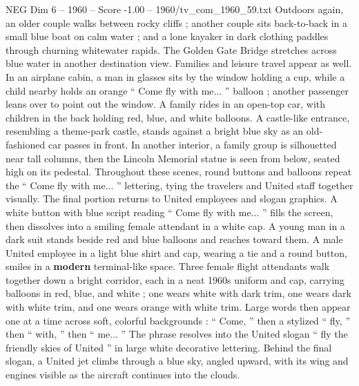 \begin{textsample}{NEG Dim 6 – 1960 – Score -1.00 – 1960/tv\_com\_1960\_59.txt}
Outdoors again, an older couple walks between rocky cliffs ; another couple sits back-to-back in a small blue boat on calm water ; and a lone kayaker in dark clothing paddles through churning whitewater rapids.
The Golden Gate Bridge stretches across blue water in another destination view.
Families and leisure travel appear as well.
In an airplane cabin, a man in glasses sits by the window holding a cup, while a child nearby holds an orange “ Come fly with me... ” balloon ; another passenger leans over to point out the window.
A family rides in an open-top car, with children in the back holding red, blue, and white balloons.
A castle-like entrance, resembling a theme-park castle, stands against a bright blue sky as an old-fashioned car passes in front.
In another interior, a family group is silhouetted near tall columns, then the Lincoln Memorial statue is seen from below, seated high on its pedestal.
Throughout these scenes, round buttons and balloons repeat the “ Come fly with me... ” lettering, tying the travelers and United staff together visually.
The final portion returns to United employees and slogan graphics.
A white button with blue script reading “ Come fly with me... ” fills the screen, then dissolves into a smiling female attendant in a white cap.
A young man in a dark suit stands beside red and blue balloons and reaches toward them.
A male United employee in a light blue shirt and cap, wearing a tie and a round button, smiles in a \textbf{modern} terminal-like space.
Three female flight attendants walk together down a bright corridor, each in a neat 1960s uniform and cap, carrying balloons in red, blue, and white ; one wears white with dark trim, one wears dark with white trim, and one wears orange with white trim.
Large words then appear one at a time across soft, colorful backgrounds : “ Come, ” then a stylized “ fly, ” then “ with, ” then “ me... ” The phrase resolves into the United slogan “ fly the friendly skies of United ” in large white decorative lettering.
Behind the final slogan, a United jet climbs through a blue sky, angled upward, with its wing and engines visible as the aircraft continues into the clouds.

\end{textsample}
